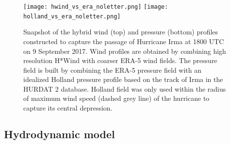 \documentclass[preprint,12pt,authoryear]{elsarticle}
\begin{document}
\begin{figure}
    \centering
    \texttt{[image: hwind\_vs\_era\_noletter.png]}
    \texttt{[image: holland\_vs\_era\_noletter.png]}
    \caption{Snapshot of the hybrid wind (top) and pressure (bottom) profiles constructed to capture the passage of Hurricane Irma at 1800 UTC on 9 September 2017. Wind profiles are obtained by combining high resolution H*Wind with coarser ERA-5 wind fields. The pressure field is built by combining the ERA-5 pressure field with an idealized Holland pressure profile based on the track of Irma in the HURDAT 2 database. Holland field was only used within the radius of maximum wind speed (dashed grey line) of the hurricane to capture its central depression. }
    \label{fig:atm}
\end{figure}

\subsection{Hydrodynamic model}
\end{document}
